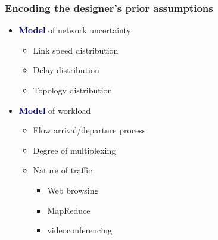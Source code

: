 \documentclass[svgnames]{beamer}
\begin{document}
\begin{frame}
\frametitle{Encoding the designer's prior assumptions}

\begin{itemize}

\Large

\item \textcolor{DarkBlue}{\bf Model} of network uncertainty

\begin{itemize}
\item Link speed distribution
\item Delay distribution
\item Topology distribution
\end{itemize}

\item \textcolor{DarkBlue}{\bf Model} of workload

\begin{itemize}
\item Flow arrival/departure process

\item Degree of multiplexing

\item Nature of traffic
\begin{itemize}
\item Web browsing
\item MapReduce
\item videoconferencing
\end{itemize}
\end{itemize}

\end{itemize}

\end{frame}
\end{document}
